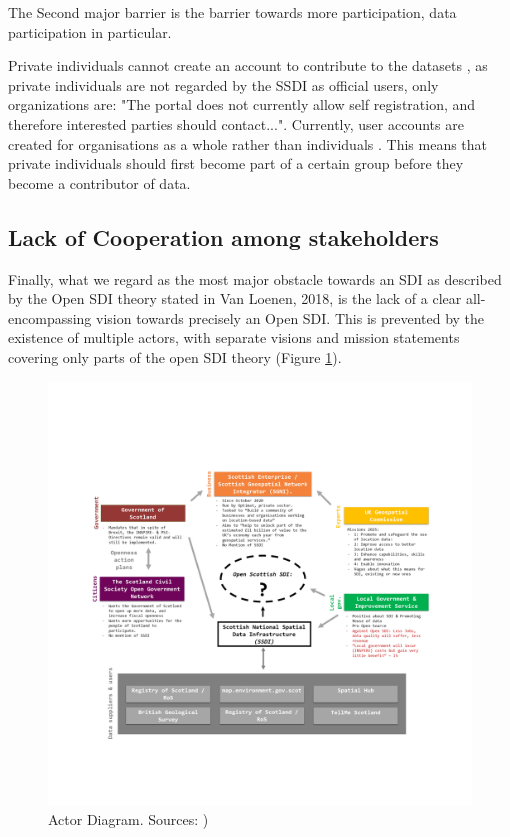 The Second major barrier is the barrier towards more participation, data participation in particular. 

Private individuals cannot create an account to contribute to the datasets \citep{ssdi_documentation}, as private individuals are not regarded by the SSDI as official users, only organizations are: "The portal does not currently allow self registration, and therefore interested parties should contact...". Currently, user accounts are created for organisations as a whole rather than individuals \citep{ssdi_documentation}. This means that private individuals should first become part of a certain group before they become a contributor of data. 



\subsection{Lack of Cooperation among stakeholders}

Finally, what we regard as the most major obstacle towards an SDI as described by the Open SDI theory stated in Van Loenen, 2018, is the lack of a clear all-encompassing vision towards precisely an Open SDI. This is prevented by the existence of multiple actors, with separate visions and mission statements covering only parts of the open SDI theory (Figure \ref{fig:actor-diagram}). 

\begin{figure}
    \hspace*{-4cm}
    \graphicspath{ {images/} }
    \includegraphics[width=22cm]{images/stakeholders.png}
    \caption{Actor Diagram. Sources: \citep{scottish_geospatial_network_integrator,impact_brexit, IS_local_SSDI, opengovpartnership_action_plan})}
    \label{fig:actor-diagram}
\end{figure}

